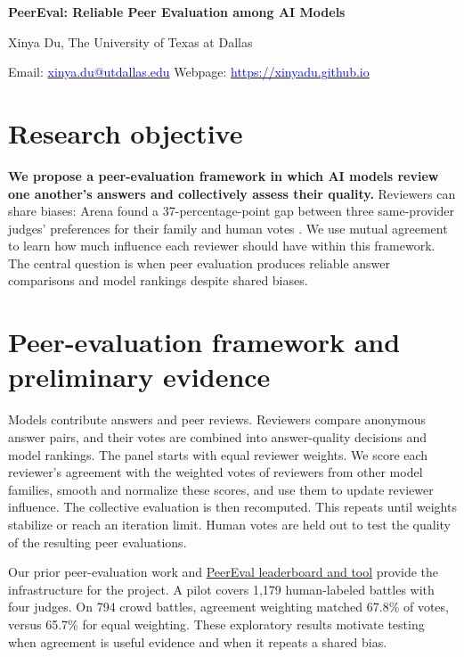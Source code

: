 \documentclass[12pt,letterpaper]{article}
\begin{document}
\begin{center}
{\large\bfseries PeerEval: Reliable Peer Evaluation among AI Models\par}
\vspace{2pt}
Xinya Du, The University of Texas at Dallas\par
{\small Email: \href{mailto:xinya.du@utdallas.edu}{\textcolor{blue}{xinya.du@utdallas.edu}} \quad Webpage: \href{https://xinyadu.github.io/}{\textcolor{blue}{https://xinyadu.github.io}}\par}
\end{center}

\section*{Research objective}
\textbf{We propose a peer-evaluation framework in which AI models review one another's answers and collectively assess their quality.} Reviewers can share biases: Arena found a 37-percentage-point gap between three same-provider judges' preferences for their family and human votes \citep{selfpreference}. We use mutual agreement to learn how much influence each reviewer should have within this framework. The central question is when peer evaluation produces reliable answer comparisons and model rankings despite shared biases.

\section*{Peer-evaluation framework and preliminary evidence}
Models contribute answers and peer reviews. Reviewers compare anonymous answer pairs, and their votes are combined into answer-quality decisions and model rankings. The panel starts with equal reviewer weights. We score each reviewer's agreement with the weighted votes of reviewers from other model families, smooth and normalize these scores, and use them to update reviewer influence. The collective evaluation is then recomputed. This repeats until weights stabilize or reach an iteration limit. Human votes are held out to test the quality of the resulting peer evaluations.

Our prior peer-evaluation work \citep{prd} and \href{https://peereval-ai.github.io/}{PeerEval leaderboard and tool} \citep{peereval} provide the infrastructure for the project. A pilot covers 1,179 human-labeled battles with four judges. On 794 crowd battles, agreement weighting matched 67.8\% of votes, versus 65.7\% for equal weighting. These exploratory results motivate testing when agreement is useful evidence and when it repeats a shared bias.
\end{document}

